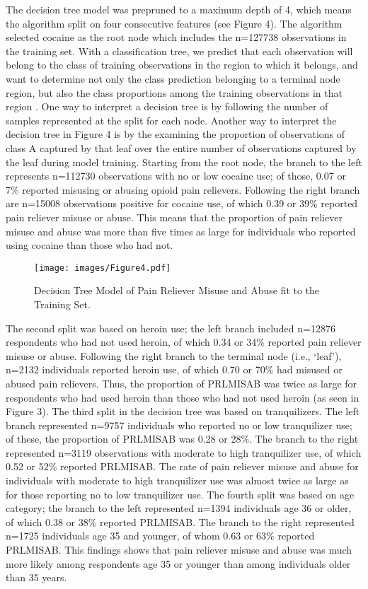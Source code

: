 \documentclass[sigconf]{acmart}
\begin{document}
The decision tree model was prepruned to a maximum depth of 4, which means 
the algorithm split on four consecutive features (see Figure 4). The  
algorithm selected cocaine as the root node which includes the n=127738 
observations in the training set. With a classification tree, we predict 
that each observation will belong to the class of training observations in 
the region to which it belongs, and want to determine not only the class
prediction belonging to a terminal node region, but also the class 
proportions among the training observations in that region \cite{james13}. 
One way to interpret a decision tree is by following the number of samples 
represented at the split for each node. Another way to interpret the decision 
tree in Figure 4 is by the examining the proportion of observations of 
class A captured by that leaf over the entire number of observations captured 
by the leaf during model training. Starting from the root node, the branch 
to the left represents n=112730 observations with no or low cocaine use; 
of those, 0.07 or 7\% reported misusing or abusing opioid pain relievers. 
Following the right branch are n=15008 observations positive for cocaine use, 
of which 0.39 or 39\% reported pain reliever misuse or abuse. This means that 
the proportion of pain reliever misuse and abuse was more than five times as 
large for individuals who reported using cocaine than those who had not. 

\begin{figure}[!ht]
  \centering\texttt{[image: images/Figure4.pdf]}
  \caption{Decision Tree Model of Pain Reliever Misuse and Abuse
  fit to the Training Set.}
  \label{f:Figure4}
\end{figure}

The second split was based on heroin use; the left branch included n=12876 
respondents who had not used heroin, of which 0.34 or 34\% reported pain
reliever misuse or abuse. Following the right branch to the terminal node 
(i.e., `leaf'), n=2132 individuals reported heroin use, of which 0.70 or 
70\% had misused or abused pain relievers. Thus, the proportion of PRLMISAB 
was twice as large for respondents who had used heroin than those who had 
not used heroin (as seen in Figure 3). The third split in the decision tree
was based on tranquilizers. The left branch represented n=9757 individuals 
who reported no or low tranquilizer use; of these, the proportion of 
PRLMISAB was 0.28 or 28\%. The branch to the right represented n=3119 
observations with moderate to high tranquilizer use, of which 0.52 or 52\% 
reported PRLMISAB. The rate of pain reliever misuse and abuse for individuals 
with moderate to high tranquilizer use was almost twice as large as for 
those reporting no to low tranquilizer use. The fourth split was based on age category; the branch to the left represented n=1394 individuals age 36 or older, 
of which 0.38 or 38\% reported PRLMISAB. The branch to the right represented 
n=1725 individuals age 35 and younger, of whom 0.63 or 63\% reported PRLMISAB. 
This findings shows that pain reliever misuse and abuse was much more likely
among respondents age 35 or younger than among individuals older than 35 years. 
\end{document}
